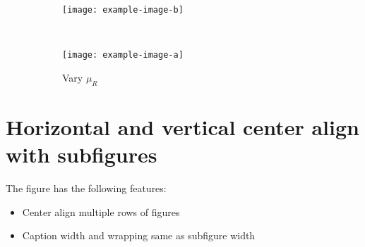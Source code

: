\documentclass[12pt,english]{article}
\begin{document}
\par\medskip
\begin{figure}[H]
    \centering
	\label{fig:horz}
    \begin{subfigure}[t]{.51\textwidth}
        \centering
        \texttt{[image: example-image-b]}
        \caption{\blindtext}
    \end{subfigure}~
	\begin{subfigure}[t]{0.48\textwidth}
	    \centering
    	\texttt{[image: example-image-a]}
    	\caption{Vary $\mu_{R}$}
	\end{subfigure}
	\caption{\blindtext}
\end{figure}
\pagebreak

\section{Horizontal and vertical center align with subfigures}
The figure has the following features:
\begin{itemize}
    \item Center align multiple rows of figures
    \item Caption width and wrapping same as subfigure width
\end{itemize}
\end{document}
